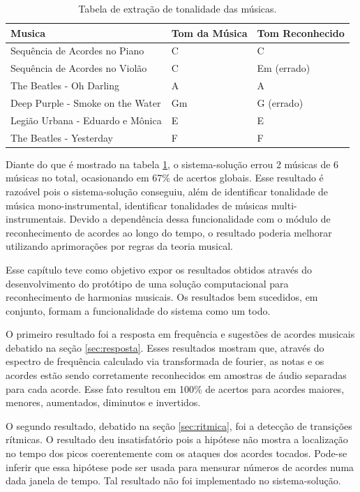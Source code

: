 \begin{table}[h]
\centering
\begin{tabular}{|l|l|l|}
\hline
Musica                           & Tom da Música & Tom Reconhecido \\ \hline
Sequência de Acordes no Piano    & C             & C               \\ \hline
Sequência de Acordes no Violão   & C             & Em (errado)     \\ \hline
The Beatles - Oh Darling         & A             & A               \\ \hline
Deep Purple - Smoke on the Water & Gm            & G (errado)      \\ \hline
Legião Urbana - Eduardo e Mônica & E             & E               \\ \hline
The Beatles - Yesterday          & F             & F               \\ \hline
\end{tabular}
\caption{Tabela de extração de tonalidade das músicas.}
\label{tab:tons}
\end{table}

Diante do que é mostrado na tabela \ref{tab:tons}, o sistema-solução errou 2 músicas de 6 músicas no total, ocasionando em 67\% de acertos globais. Esse resultado é razoável pois o sistema-solução conseguiu, além de identificar tonalidade de música mono-instrumental, identificar tonalidades de músicas multi-instrumentais. Devido a dependência dessa funcionalidade com o módulo de reconhecimento de acordes ao longo do tempo, o resultado poderia melhorar utilizando aprimorações por regras da teoria musical.

Esse capítulo teve como objetivo expor os resultados obtidos através do desenvolvimento do protótipo de uma solução computacional para reconhecimento de harmonias musicais. Os resultados bem sucedidos, em conjunto, formam a funcionalidade do sistema como um todo.

O primeiro resultado foi a resposta em frequência e sugestões de acordes musicais debatido na seção \ref{sec:resposta}. Esses resultados mostram que, através do espectro de frequência calculado via transformada de fourier, as notas e os acordes estão sendo corretamente reconhecidos em amostras de áudio separadas para cada acorde. Esse fato resultou em 100\% de acertos para acordes maiores, menores, aumentados, diminutos e invertidos.

O segundo resultado, debatido na seção \ref{sec:ritmica}, foi a detecção de transições rítmicas. O resultado deu insatisfatório pois a hipótese não mostra a localização no tempo dos picos coerentemente com os ataques dos acordes tocados. Pode-se inferir que essa hipótese pode ser usada para mensurar números de acordes numa dada janela de tempo. Tal resultado não foi implementado no sistema-solução.

